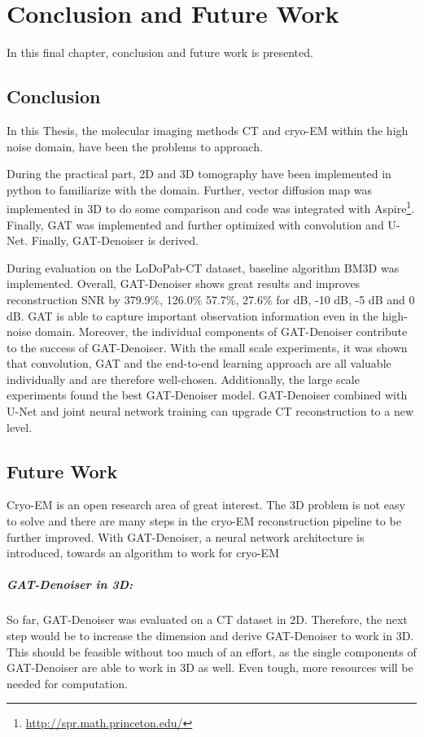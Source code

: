 \chapter{Conclusion and Future Work}
\label{sec:Conclusion}

In this final chapter, conclusion and future work is presented.

\section{Conclusion}

In this Thesis, the molecular imaging methods CT and cryo-EM
within the high noise domain, have been the problems to approach.

During the practical part, 2D and 3D tomography have been implemented 
in python to familiarize with the domain.
Further, vector diffusion map was implemented in 3D to do some comparison
and code was integrated with Aspire\footnote{\url{http://spr.math.princeton.edu/}}.
Finally, GAT was implemented and further optimized with convolution and U-Net.
Finally, GAT-Denoiser is derived.

During evaluation on the LoDoPab-CT dataset, baseline algorithm BM3D was implemented.
Overall, GAT-Denoiser shows great results and improves reconstruction SNR 
by 379.9\%, 126.0\% 57.7\%, 27.6\% for  dB, -10 dB, -5 dB and 0 dB.
GAT is able to capture important observation information even in the high-noise domain.
Moreover, the individual components of GAT-Denoiser contribute to the success of GAT-Denoiser.
With the small scale experiments, 
it was shown that convolution, GAT and the end-to-end learning approach are all valuable individually
and are therefore well-chosen.
Additionally, the large scale experiments found the best GAT-Denoiser model.
GAT-Denoiser combined with U-Net and joint neural network training can upgrade CT reconstruction to a new level. 


\section{Future Work}
Cryo-EM is an open research area of great interest.
The 3D problem is not easy to solve and there are many steps in the cryo-EM reconstruction pipeline 
to be further improved. With GAT-Denoiser, a neural network architecture is introduced, 
towards an algorithm to work for cryo-EM

\paragraph{GAT-Denoiser in 3D:}
So far, GAT-Denoiser was evaluated on a CT dataset in 2D.
Therefore, the next step would be to increase the dimension and 
derive GAT-Denoiser to work in 3D. This should be feasible without too much of an effort,
as the single components of GAT-Denoiser are able to work in 3D as well. 
Even tough, more resources will be needed for computation.

